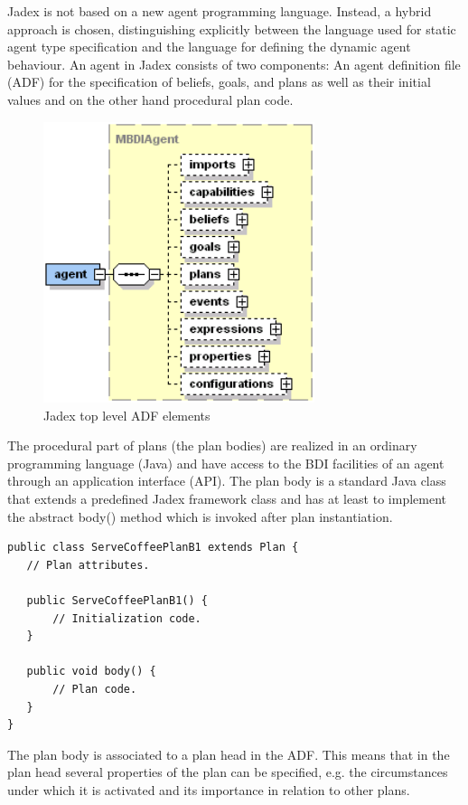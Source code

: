 Jadex is not based on a new agent programming language. Instead, a hybrid approach is chosen, distinguishing explicitly between the language used for static agent type specification and the language for defining the dynamic agent behaviour. An agent in Jadex consists of two components: An agent definition file (ADF) for the specification of beliefs, goals, and plans as well as their initial values and on the other hand procedural plan code.
\begin{figure}
	\centering
	\includegraphics[width=300px]{images/jadexagentadf.png}
  \caption{Jadex top level ADF elements \cite{ActiveComponents}}
	\label{fig3}
\end{figure}
The procedural part of plans  (the plan bodies) are realized in an ordinary programming language (Java) and have access to the BDI facilities of an agent through an application interface (API). The plan body is a standard Java class that extends a predefined Jadex framework class and has at least to implement the abstract body() method which is invoked after plan instantiation.
\begin{lstlisting}
public class ServeCoffeePlanB1 extends Plan {
   // Plan attributes.

   public ServeCoffeePlanB1() {
       // Initialization code.
   }

   public void body() {
       // Plan code.
   }
}
\end{lstlisting}
 The plan body is associated to a plan head in the ADF. This means that in the plan head several properties of the plan can be specified, e.g. the circumstances under which it is activated and its importance in relation to other plans.
